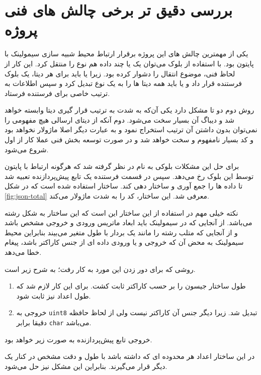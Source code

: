 \section{بررسی دقیق تر برخی چالش های فنی پروژه}\label{ch:fani|sec:chalenges}

یکی از مهمترین چالش های این پروژه برقرار ارتباط محیط شبیه سازی سیمولینک با پایتون بود. با استفاده از بلوک  می‌توان یک یا چند داده هم نوع را منتقل کرد. این کار از لحاظ فنی، موضوع انتقال را دشوار کرده بود. زیرا یا باید برای هر دیتا، یک بلوک فرستنده قرار داد و یا باید همه دیتا ها را به یک نوع تبدیل کرد و سپس اطلاعات به ترتیب خاصی برای فرستنده فرستاد. 

روش دوم دو تا مشکل دارد یکی آن‌که به شدت به ترتیب قرار گیری دیتا وابسته خواهد شد و دیباگ آن بسیار سخت می‌شود. دوم آنکه از دیتای ارسالی هیچ مفهومی را نمی‌توان بدون داشتن آن ترتیب استخراج نمود و به عبارت دیگر اصلا ماژولار نخواهد بود و کد بسیار نامفهوم و سخت خواهد شد و در صورت توسعه بخش فنی عملا کار از اول شروع می‌شود.

برای حل این مشکلات بلوکی به نام  در نظر گرفته شد که هرگونه ارتباط با پایتون توسط این بلوک رخ می‌دهد. سپس در قسمت فرستنده یک تابع پیش‌پردازنده تعبیه شد تا داده ها را جمع آوری و ساختار دهی کند. ساختار استفاده شده  است که در شکل \ref{fig:json-total} معرفی شد. این ساختار، کد را به شدت ماژولار می‌کند.

نکته خیلی مهم در استفاده از این ساختار این است که این ساختار به شکل رشته می‌باشد. از آنجایی که در سیمولینک باید ابعاد ماتریس ورودی و خروجی مشخص باشد و از آنجایی که متلب رشته را مانند یک بردار با طول متغیر می‌بیند بنابراین محیط سیمولینک به محض آن که خروجی و یا ورودی داده ای از جنس کاراکتر باشد، پیغام خطا می‌دهد.

روشی که برای دور زدن این مورد به کار رفت؛ به شرح زیر است.

\begin{enumerate}
	\item 
	طول ساختار جیسون را بر حسب کاراکتر ثابت کشت. برای این کار لازم شد که طول اعداد نیز ثابت شود.
	\item 
		خروجی به \texttt{uint8} تبدیل شد. زیرا دیگر جنس آن کاراکتر نیست ولی از لحاظ حافظه دقیقا برابر \texttt{char} می‌باشد.
	
\end{enumerate} 

خروجی تابع پیش‌پردازنده به صورت زیر خواهد بود.




در این ساختار اعداد هر محدوده ای که داشته باشد با طول و دقت مشخص در کنار یک دیگر قرار می‌گیرند. بنابراین این مشکل نیز حل می‌شود. 

 